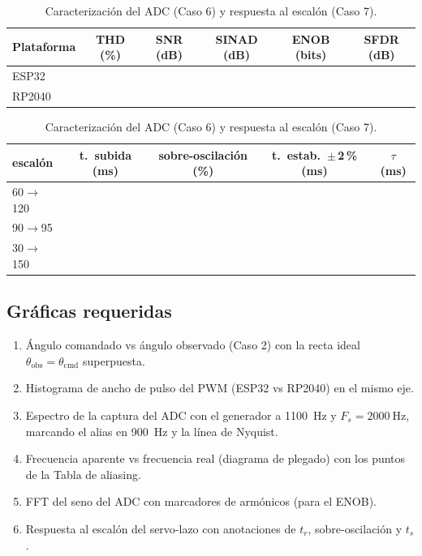 \documentclass[11pt]{article}
\begin{document}
\begin{table}[H]\centering
\caption{Caracterización del ADC (Caso 6) y respuesta al escalón (Caso 7).}
\begin{tabular}{lccccc}
\toprule
Plataforma & THD (\%) & SNR (dB) & SINAD (dB) & ENOB (bits) & SFDR (dB) \\
\midrule
ESP32  & & & & & \\
RP2040 & & & & & \\
\bottomrule
\end{tabular}

\vspace{0.6em}
\begin{tabular}{lcccc}
\toprule
escalón & t.\ subida (ms) & sobre-oscilación (\%) & t.\ estab.\ \(\pm\)\,2\,\% (ms) & $\tau$ (ms) \\
\midrule
60$\to$120 & & & & \\
90$\to$95  & & & & \\
30$\to$150 & & & & \\
\bottomrule
\end{tabular}
\end{table}

\subsection{Gráficas requeridas}
\begin{enumerate}
  \item Ángulo comandado vs ángulo observado (Caso 2) con la recta ideal
        $\theta_\text{obs}=\theta_\text{cmd}$ superpuesta.
  \item Histograma de ancho de pulso del PWM (ESP32 vs RP2040) en el mismo eje.
  \item Espectro de la captura del ADC con el generador a \SI{1100}{\hertz} y
        $F_s=\SI{2000}{\hertz}$, marcando el alias en \SI{900}{\hertz} y la línea de Nyquist.
  \item Frecuencia aparente vs frecuencia real (diagrama de plegado) con los puntos de
        la Tabla de aliasing.
  \item FFT del seno del ADC con marcadores de armónicos (para el ENOB).
  \item Respuesta al escalón del servo-lazo con anotaciones de $t_r$, sobre-oscilación y $t_s$.
\end{enumerate}

\end{document}
